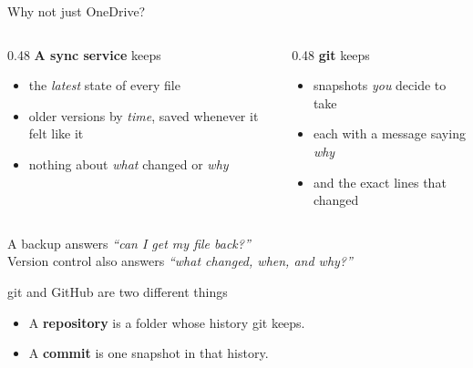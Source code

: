 \documentclass[aspectratio=169,11pt]{beamer}
\newcommand{\key}[1]{\textbf{\textcolor{ban}{#1}}}
\begin{document}
\begin{frame}{Why not just OneDrive?}
  \begin{columns}[T]
    \begin{column}{0.48\textwidth}
      \textbf{A sync service} keeps
      \begin{itemize}
        \item the \emph{latest} state of every file
        \item older versions by \emph{time}, saved whenever it felt like it
        \item nothing about \emph{what} changed or \emph{why}
      \end{itemize}
    \end{column}
    \begin{column}{0.48\textwidth}
      \textbf{git} keeps
      \begin{itemize}
        \item snapshots \emph{you} decide to take
        \item each with a message saying \emph{why}
        \item and the exact lines that changed
      \end{itemize}
    \end{column}
  \end{columns}
  \vspace{1.5em}
  \centering
  A backup answers \emph{``can I get my file back?''}\\
  Version control also answers \emph{``what changed, when, and why?''}
\end{frame}

\begin{frame}{git and GitHub are two different things}
  \centering

  \vspace{1.2em}
  \raggedright
  \begin{itemize}
    \item A \key{repository} is a folder whose history git keeps.
    \item A \key{commit} is one snapshot in that history.
  \end{itemize}
\end{frame}
\end{document}
